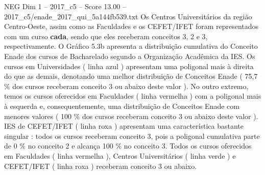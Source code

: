 \begin{textsample}{NEG Dim 1 – 2017\_c5 – Score 13.00 – 2017\_c5/enade\_2017\_qui\_5a144fb539.txt}
Os Centros Universitários da região Centro-Oeste, assim como as Faculdades e os CEFET/IFET foram representados com um curso \textbf{cada}, sendo que eles receberam conceitos 3, 2 e 3, respectivamente.
O Gráfico 5.3b apresenta a distribuição cumulativa do Conceito Enade dos cursos de Bacharelado segundo a Organização Acadêmica da IES.
Os cursos em Universidades ( linha azul ) apresentam uma poligonal mais à direita do que as demais, denotando uma melhor distribuição de Conceitos Enade ( 75,7 \% dos cursos receberam conceito 3 ou abaixo deste valor ).
No outro extremo, temos os cursos oferecidos em Faculdades ( linha vermelha ) com a poligonal mais à esquerda e, consequentemente, uma distribuição de Conceitos Enade com menores valores ( 100 \% dos cursos receberam conceito 3 ou abaixo deste valor ).
IES de CEFET/IFET ( linha roxa ) apresentam uma característica bastante singular : todos os cursos receberam conceito 3, pois a poligonal cumulativa parte de 0 \% no conceito 2 e alcança 100 \% no conceito 3.
Todos os cursos oferecidos em Faculdades ( linha vermelha ), Centros Universitários ( linha verde ) e CEFET/IFET ( linha roxa ) receberam conceito 3 ou abaixo.

\end{textsample}
